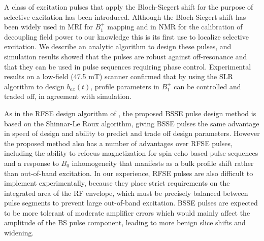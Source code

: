 \documentclass{article}
\newcommand{\bext}{b_{ex}(t)}
\begin{document}
A class of excitation pulses that apply the Bloch-Siegert shift for the purpose of selective excitation
has been introduced.
Although the Bloch-Siegert shift has been widely used in MRI for $B_1^+$ mapping \cite{Sacolick2010B1Shift, KhalighiAdiabaticMapping} and in NMR for the calibration of decoupling field power \cite{Claridge2016High-ResolutionEdition,Hung2020UsingSample} 
to our knowledge this is its first use to localize selective excitation.
We describe an analytic algorithm to design these pulses,
and simulation results showed that the pulses are robust against off-resonance and that they can  be used in pulse sequences requiring phase control. 
Experimental results on a low-field (47.5 mT) scanner confirmed that by using the SLR algorithm to design $\bext$,
profile parameters in $B_1^+$ can be controlled and traded off, in agreement with simulation. 

\par As in the RFSE design algorithm of \cite{Grissom2014B1+-selectiveAlgorithm}, 
the proposed BSSE pulse design method is based on the Shinnar-Le Roux algorithm, 
giving BSSE pulses the same advantage in speed of design and ability to predict and trade off design parameters. 
However the proposed method also has a number of advantages over RFSE pulses, 
including the ability to refocus magnetization for spin-echo based pulse sequences and a response to $B_0$ inhomogeneity that manifests as a bulk profile shift rather than out-of-band excitation. 
In our experience, RFSE pulses are also difficult to implement experimentally, 
because they place strict requirements on the integrated area of the RF envelope, 
which must be precisely balanced between pulse segments to prevent large out-of-band excitation. BSSE pulses are expected to be more tolerant of moderate amplifier errors which would mainly affect the amplitude of the BS pulse component, leading to more benign slice shifts and widening.
\end{document}
